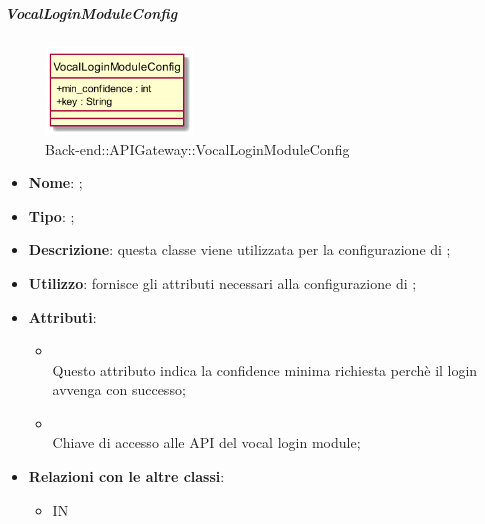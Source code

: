 \hypertarget{VocalLoginModuleConfig_label}{\subparagraph{VocalLoginModuleConfig}}
\begin{figure}[h]
	\centering
	\includegraphics[width=0.35\textwidth,height=\textheight,keepaspectratio]{images/ClassVocalLoginModuleConfig.png}
	\caption{Back-end::APIGateway::VocalLoginModuleConfig}
\end{figure}
\begin{itemize}
	\item \textbf{Nome}: ;
	\item \textbf{Tipo}: ;
	\item \textbf{Descrizione}: questa classe viene utilizzata per la configurazione di ;
	\item \textbf{Utilizzo}: fornisce gli attributi necessari alla configurazione di ;
	\item \textbf{Attributi}:
	\begin{itemize}
		\item[]  \\
		Questo attributo indica la confidence minima richiesta perchè il login avvenga con successo;
		\item[]  \\
		Chiave di accesso alle API del vocal login module;
	\end{itemize}
	\item \textbf{Relazioni con le altre classi}:
	\begin{itemize}
		\item IN \hyperlink{VocalLoginMicrosoftModule_label}{}
	\end{itemize}
\end{itemize}
\FloatBarrier
\newpage
